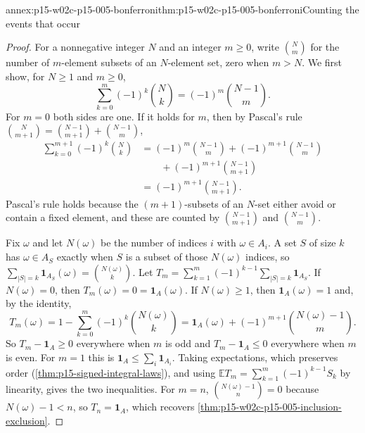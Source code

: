 \begin{annexitem}{annex:p15-w02c-p15-005-bonferroni}{thm:p15-w02c-p15-005-bonferroni}{Counting the events that occur}
\begin{proof}
For a nonnegative integer \(N\) and an integer \(m\geq0\), write
\(\binom Nm\) for the number of \(m\)-element subsets of an
\(N\)-element set, zero when \(m>N\). We first show, for \(N\geq1\)
and \(m\geq0\),
\[
 \sum_{k=0}^m(-1)^k\binom Nk=(-1)^m\binom{N-1}m .
\]
For \(m=0\) both sides are one. If it holds for \(m\), then by
Pascal's rule \(\binom N{m+1}=\binom{N-1}{m+1}+\binom{N-1}m\),
\[
 \begin{aligned}
 \sum_{k=0}^{m+1}(-1)^k\binom Nk
 &=(-1)^m\binom{N-1}m+(-1)^{m+1}\binom{N-1}m\\
 &\qquad+(-1)^{m+1}\binom{N-1}{m+1}\\
 &=(-1)^{m+1}\binom{N-1}{m+1}.
 \end{aligned}
\]
Pascal's rule holds because the \((m+1)\)-subsets of an \(N\)-set either
avoid or contain a fixed element, and these are counted by
\(\binom{N-1}{m+1}\) and \(\binom{N-1}m\).

Fix \(\omega\) and let \(N(\omega)\) be the number of indices \(i\) with
\(\omega\in A_i\). A set \(S\) of size \(k\) has \(\omega\in A_S\)
exactly when \(S\) is a subset of those \(N(\omega)\) indices, so
\(\sum_{|S|=k}\mathbf1_{A_S}(\omega)=\binom{N(\omega)}k\). Let
\(T_m=\sum_{k=1}^m(-1)^{k-1}\sum_{|S|=k}\mathbf1_{A_S}\). If
\(N(\omega)=0\), then \(T_m(\omega)=0=\mathbf1_A(\omega)\). If
\(N(\omega)\geq1\), then \(\mathbf1_A(\omega)=1\) and, by the identity,
\[
 T_m(\omega)=1-\sum_{k=0}^m(-1)^k\binom{N(\omega)}k
 =\mathbf1_A(\omega)+(-1)^{m+1}\binom{N(\omega)-1}m .
\]
So \(T_m-\mathbf1_A\geq0\) everywhere when \(m\) is odd and
\(T_m-\mathbf1_A\leq0\) everywhere when \(m\) is even. For \(m=1\) this
is \(\mathbf1_A\leq\sum_i\mathbf1_{A_i}\). Taking expectations, which
preserves order (\cref{thm:p15-signed-integral-laws}), and using
\(\mathbb ET_m=\sum_{k=1}^m(-1)^{k-1}S_k\) by linearity, gives the two
inequalities. For \(m=n\), \(\binom{N(\omega)-1}n=0\) because
\(N(\omega)-1<n\), so \(T_n=\mathbf1_A\), which recovers
\cref{thm:p15-w02c-p15-005-inclusion-exclusion}.
\end{proof}
\end{annexitem}

